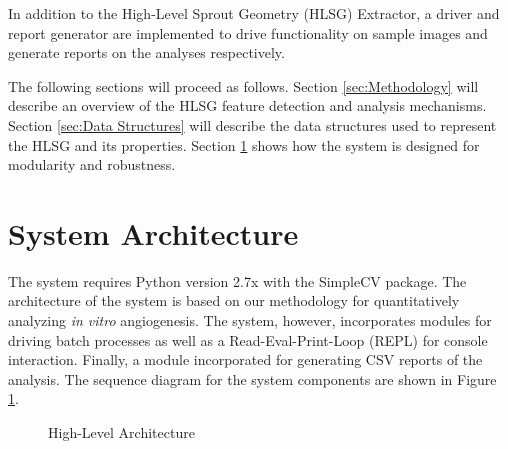 \documentclass{sig-alternate}
\newcommand{\invitro}{\emph{in vitro} }
\begin{document}
	In addition to the High-Level Sprout Geometry (HLSG) Extractor, a driver
	and report generator are implemented to drive functionality on sample
	images and generate reports on the analyses respectively.

	The following sections will proceed as follows. Section
	\ref{sec:Methodology} will describe an overview of the HLSG feature
	detection and analysis mechanisms. Section \ref{sec:Data Structures}
	will describe the data structures used to represent the HLSG and its
	properties. Section \ref{sec:System Architecture} shows how the system
	is designed for modularity and robustness.

\section{System Architecture} %
\label{sec:System Architecture}
	The system requires Python version 2.7x with the SimpleCV package. The
	architecture of the system is based on our methodology for
	quantitatively analyzing \invitro angiogenesis. The system, however,
	incorporates modules for driving batch processes as well as a
	Read-Eval-Print-Loop (REPL) for console interaction. Finally, a module
	incorporated for generating CSV reports of the analysis. The sequence
	diagram for the system components are shown in Figure
	\ref{fig:sysarch}.
	\begin{figure}[ht!]
		\centering
		
		\caption{High-Level Architecture}
		\label{fig:sysarch}
	\end{figure}

\end{document}
